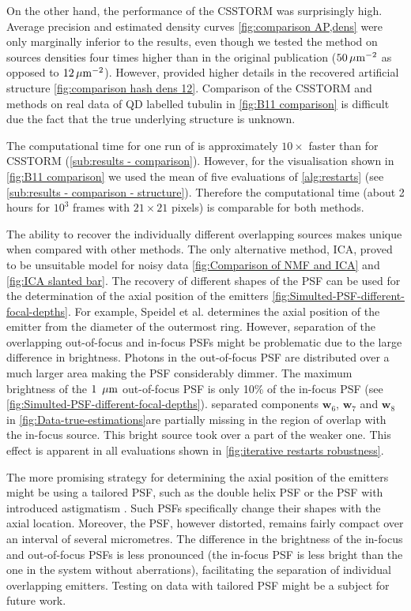 On the other hand, the performance of the CSSTORM was surprisingly high. Average precision and estimated density curves \autoref{fig:comparison AP,dens} were only marginally inferior to the \inmf{} results, even though we tested the method on sources densities four times higher than in the original publication \cite{Zhu2012} ($50 \, \mathrm{\mu m}^{-2}$ as opposed to $12 \, \mathrm{\mu m}^{-2}$). However, \inmf{} provided higher details in the recovered artificial structure \autoref{fig:comparison hash dens 12}. Comparison of the CSSTORM and \inmf{} methods on real data of QD labelled tubulin in \autoref{fig:B11 comparison} is difficult due the fact that the true underlying structure is unknown. 

The computational time for one run of \inmf{} is approximately $10\times$ faster than for CSSTORM (\autoref{sub:results - comparison}). However, for the visualisation shown in \autoref{fig:B11 comparison} we used the mean of five evaluations of \autoref{alg:restarts} (see \autoref{sub:results - comparison - structure}). Therefore the computational time (about 2 hours for  $10^3$ frames with $21 \times 21$ pixels) is comparable for both methods. 

The ability to recover the individually different overlapping sources makes \inmf{} unique when compared with other methods. The only alternative method, ICA, proved to be unsuitable model for noisy data \autoref{fig:Comparison of NMF and ICA} and \ref{fig:ICA slanted bar}. The recovery of different shapes of the PSF can be used for the determination of the axial position of the emitters \autoref{fig:Simulted-PSF-different-focal-depths}. For example, Speidel et al. \cite{Speidel2003} determines the axial position of the emitter from the diameter of the outermost ring. However, separation of the overlapping out-of-focus and in-focus PSFs might be problematic due to the large difference in brightness. Photons in the out-of-focus PSF are distributed over a much larger area making the PSF considerably dimmer. The maximum brightness of the $1\ \um$ out-of-focus PSF is only 10\% of the in-focus PSF (see \autoref{fig:Simulted-PSF-different-focal-depths}). \inmf{} separated components $\bm{w}_6$, $\bm{w}_7$ and $\bm{w}_8$ in \autoref{fig:Data-true-estimations}\ddd are partially missing in the region of overlap with the in-focus source. This bright source took over a part of the weaker one. This effect is apparent in all evaluations shown in \autoref{fig:iterative restarts robustness}.

The more promising strategy for determining the axial position of the emitters might be using a tailored PSF, such as the double helix PSF \cite{Quirin2011} or the PSF with introduced astigmatism \cite{Huang2008}. Such PSFs specifically change their shapes with the axial location. Moreover, the PSF, however distorted, remains fairly compact over an interval of several micrometres. The difference in the brightness of the in-focus and out-of-focus PSFs is less pronounced (the in-focus PSF is less bright than the one in the system without aberrations), facilitating the separation of individual overlapping emitters. Testing \inmf{} on data with tailored PSF \cite{Huang2008,Quirin2011} might be a subject for future work. 

